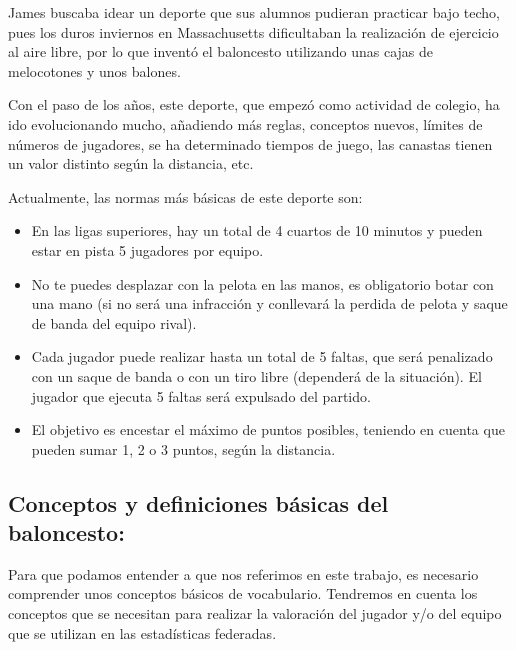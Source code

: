 \documentclass[paper=a4, fontsize=9pt]{article}
\begin{document}
James buscaba idear un deporte que sus alumnos pudieran practicar bajo techo, pues los duros inviernos en Massachusetts dificultaban la realización de ejercicio al aire libre, por lo que inventó el baloncesto utilizando unas cajas de melocotones y unos balones.

Con el paso de los años, este deporte, que empezó como actividad de colegio, ha ido evolucionando mucho, añadiendo más reglas, conceptos nuevos, límites de números de jugadores, se ha determinado tiempos de juego, las canastas tienen un valor distinto según la distancia, etc.

Actualmente, las normas más básicas de este deporte son:

\begin{itemize}

\item En las ligas superiores, hay un total de 4 cuartos de 10 minutos y pueden estar en pista 5 jugadores por equipo.
\item No te puedes desplazar con la pelota en las manos, es obligatorio botar con una mano (si no será una infracción y conllevará la perdida de pelota y saque de banda del equipo rival).
\item Cada jugador puede realizar hasta un total de 5 faltas, que será penalizado con un saque de banda o con un tiro libre (dependerá de la situación). El jugador que ejecuta 5 faltas será expulsado del partido.
\item El objetivo es encestar el máximo de puntos posibles, teniendo en cuenta que pueden sumar 1, 2 o 3 puntos, según la distancia.

\end{itemize}



\subsection{Conceptos y definiciones básicas del baloncesto:}

Para que podamos entender a que nos referimos en este trabajo, es necesario comprender unos conceptos básicos de vocabulario. Tendremos en cuenta los conceptos que se necesitan para realizar la valoración del jugador y/o del equipo que se utilizan en las estadísticas federadas.
\end{document}
